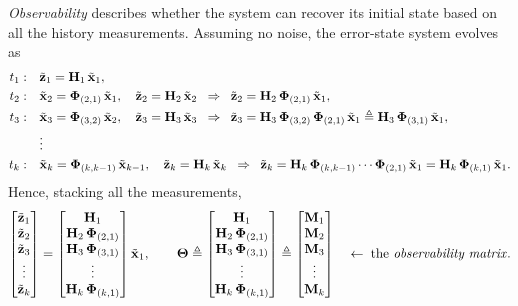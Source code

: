 \emph{Observability} describes whether the system can recover its initial state based on all the history measurements. Assuming no noise, the error-state system evolves as
\begin{align}
t_1:&\quad \tilde{\vect{z}}_1 = \vect{H}_1\,\tilde{\vect{x}}_1, \notag \\
t_2:&\quad \tilde{\vect{x}}_2 = \vect{\Phi}_{(2,1)}\,\tilde{\vect{x}}_1,
\quad \tilde{\vect{z}}_2 = \vect{H}_2\,\tilde{\vect{x}}_2
\;\;\Rightarrow\;\; \tilde{\vect{z}}_2 = \vect{H}_2\,\vect{\Phi}_{(2,1)}\,\tilde{\vect{x}}_1, \notag \\
t_3:&\quad \tilde{\vect{x}}_3 = \vect{\Phi}_{(3,2)}\,\tilde{\vect{x}}_2,
\quad \tilde{\vect{z}}_3 = \vect{H}_3\,\tilde{\vect{x}}_3
\;\;\Rightarrow\;\; \tilde{\vect{z}}_3 = \vect{H}_3\,\vect{\Phi}_{(3,2)}\,\vect{\Phi}_{(2,1)}\,\tilde{\vect{x}}_1
\triangleq \vect{H}_3\,\vect{\Phi}_{(3,1)}\,\tilde{\vect{x}}_1, \notag \\
&\quad\vdots \notag \\
t_k:&\quad \tilde{\vect{x}}_k = \vect{\Phi}_{(k,k-1)}\,\tilde{\vect{x}}_{k-1},
\quad \tilde{\vect{z}}_k = \vect{H}_k\,\tilde{\vect{x}}_k
\;\;\Rightarrow\;\; \tilde{\vect{z}}_k = \vect{H}_k\,\vect{\Phi}_{(k,k-1)}\cdots\vect{\Phi}_{(2,1)}\,\tilde{\vect{x}}_1
= \vect{H}_k\,\vect{\Phi}_{(k,1)}\,\tilde{\vect{x}}_1.
\end{align}
Hence, stacking all the measurements,
\begin{align}
\begin{bmatrix}
\tilde{\vect{z}}_1 \\ \tilde{\vect{z}}_2 \\ \tilde{\vect{z}}_3 \\ \vdots \\ \tilde{\vect{z}}_k
\end{bmatrix}
=
\begin{bmatrix}
\vect{H}_1 \\
\vect{H}_2\,\vect{\Phi}_{(2,1)} \\
\vect{H}_3\,\vect{\Phi}_{(3,1)} \\
\vdots \\
\vect{H}_k\,\vect{\Phi}_{(k,1)}
\end{bmatrix}
\tilde{\vect{x}}_1,
\qquad
\vect{\Theta} \triangleq
\begin{bmatrix}
\vect{H}_1 \\
\vect{H}_2\,\vect{\Phi}_{(2,1)} \\
\vect{H}_3\,\vect{\Phi}_{(3,1)} \\
\vdots \\
\vect{H}_k\,\vect{\Phi}_{(k,1)}
\end{bmatrix}
\triangleq
\begin{bmatrix}
\vect{M}_1 \\ \vect{M}_2 \\ \vect{M}_3 \\ \vdots \\ \vect{M}_k
\end{bmatrix}
\quad\leftarrow\;\text{the \emph{observability matrix}}.
\end{align}

